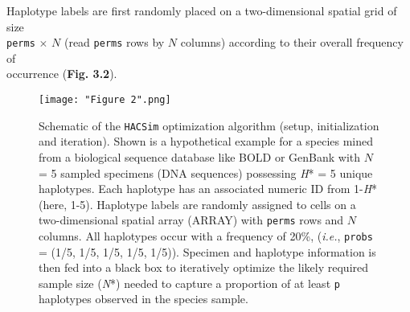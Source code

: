 Haplotype labels are first randomly placed on a two-dimensional spatial grid of size \\ {\tt perms} $\times$ $N$ (read {\tt perms} rows by $N$ columns) according to their overall frequency of \\ occurrence (\textbf{Fig. 3.2}). 


\begin{figure}[H]

\centering

\texttt{[image: "Figure 2".png]}

\caption{Schematic of the {\tt HACSim} optimization algorithm (setup, initialization and iteration). Shown is a hypothetical example for a species mined from a biological sequence database like BOLD or GenBank with $N$ = 5 sampled specimens (DNA sequences) possessing \textit{H}* = 5 unique haplotypes. Each haplotype has an associated numeric ID from 1-\textit{H}* (here, 1-5). Haplotype labels are randomly assigned to cells on a two-dimensional spatial array (ARRAY) with {\tt perms} rows and $N$ columns.  All haplotypes occur with a frequency of 20\%, (\textit{i.e.}, {\tt probs} = (1/5, 1/5, 1/5, 1/5, 1/5)). Specimen and haplotype information is then fed into a black box to iteratively optimize the likely required sample size (\textit{N}*) needed to capture a proportion of at least {\tt p} haplotypes observed in the species sample.}

\end{figure}


